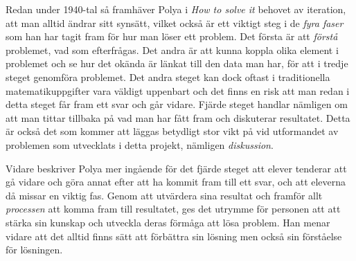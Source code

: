 \textcolor{Mahogany}{
    Redan under 1940-tal så framhäver Polya i \textsl{How to solve it} \cite{Polya} behovet av iteration, att man alltid ändrar sitt synsätt, vilket också är ett viktigt steg i de \textsl{fyra faser} som han har tagit fram för hur man löser ett problem.
    Det första är att \textsl{förstå} problemet, vad som efterfrågas. Det andra är att kunna koppla olika element i problemet och se hur det okända är länkat till den data man har, för att i tredje steget genomföra problemet. 
    Det andra steget kan dock oftast i traditionella matematikuppgifter vara väldigt uppenbart och det finns en risk att man redan i detta steget får fram ett svar och går vidare. 
    Fjärde steget handlar nämligen om att man tittar tillbaka på vad man har fått fram och diskuterar resultatet. Detta är också det som kommer att läggas betydligt stor vikt på vid utformandet av problemen som utvecklats i detta projekt, nämligen \textsl{diskussion}.
}

\textcolor{Mahogany}{
    Vidare beskriver Polya mer ingående för det fjärde steget att elever tenderar att gå vidare och göra annat efter att ha kommit fram till ett svar, och att eleverna då missar en viktig fas. Genom att utvärdera sina resultat och framför allt \textsl{processen} att komma fram till resultatet, ges det utrymme för personen att att stärka sin kunskap och utveckla deras förmåga att lösa problem. Han menar vidare att det alltid finns sätt att förbättra sin lösning men också sin förståelse för lösningen.
}